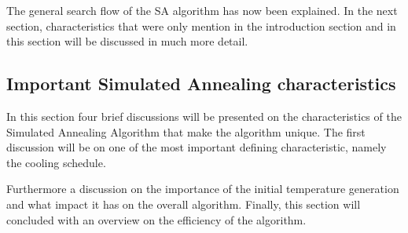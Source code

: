 The general search flow of the SA algorithm has now been explained. In the next section, characteristics that were only mention in the introduction section and in this section will be discussed in much more detail.
\subsection{Important Simulated Annealing characteristics}
In this section four brief discussions will be presented on the characteristics of the Simulated Annealing Algorithm that make the algorithm unique. The first discussion will be on one of the most important defining characteristic, namely the cooling schedule. 

Furthermore a discussion on the importance of the initial temperature generation and what impact it has on the overall algorithm. Finally, this section will concluded with an overview on the efficiency of the algorithm.

